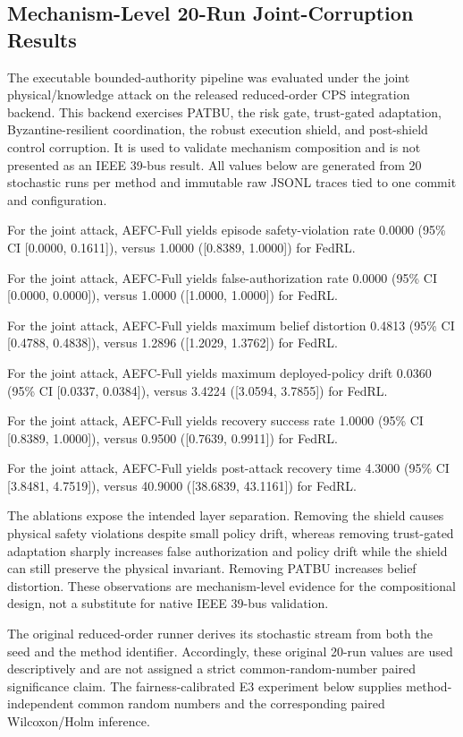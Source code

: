 \subsection{Mechanism-Level 20-Run Joint-Corruption Results}

The executable bounded-authority pipeline was evaluated under the joint physical/knowledge attack on the released reduced-order CPS integration backend. This backend exercises PATBU, the risk gate, trust-gated adaptation, Byzantine-resilient coordination, the robust execution shield, and post-shield control corruption. It is used to validate mechanism composition and is not presented as an IEEE 39-bus result. All values below are generated from 20 stochastic runs per method and immutable raw JSONL traces tied to one commit and configuration.



For the joint attack, AEFC-Full yields episode safety-violation rate 0.0000 (95\% CI [0.0000, 0.1611]), versus 1.0000 ([0.8389, 1.0000]) for FedRL.

For the joint attack, AEFC-Full yields false-authorization rate 0.0000 (95\% CI [0.0000, 0.0000]), versus 1.0000 ([1.0000, 1.0000]) for FedRL.

For the joint attack, AEFC-Full yields maximum belief distortion 0.4813 (95\% CI [0.4788, 0.4838]), versus 1.2896 ([1.2029, 1.3762]) for FedRL.

For the joint attack, AEFC-Full yields maximum deployed-policy drift 0.0360 (95\% CI [0.0337, 0.0384]), versus 3.4224 ([3.0594, 3.7855]) for FedRL.

For the joint attack, AEFC-Full yields recovery success rate 1.0000 (95\% CI [0.8389, 1.0000]), versus 0.9500 ([0.7639, 0.9911]) for FedRL.

For the joint attack, AEFC-Full yields post-attack recovery time 4.3000 (95\% CI [3.8481, 4.7519]), versus 40.9000 ([38.6839, 43.1161]) for FedRL.

The ablations expose the intended layer separation. Removing the shield causes physical safety violations despite small policy drift, whereas removing trust-gated adaptation sharply increases false authorization and policy drift while the shield can still preserve the physical invariant. Removing PATBU increases belief distortion. These observations are mechanism-level evidence for the compositional design, not a substitute for native IEEE 39-bus validation.

The original reduced-order runner derives its stochastic stream from both the seed and the method identifier. Accordingly, these original 20-run values are used descriptively and are not assigned a strict common-random-number paired significance claim. The fairness-calibrated E3 experiment below supplies method-independent common random numbers and the corresponding paired Wilcoxon/Holm inference.
